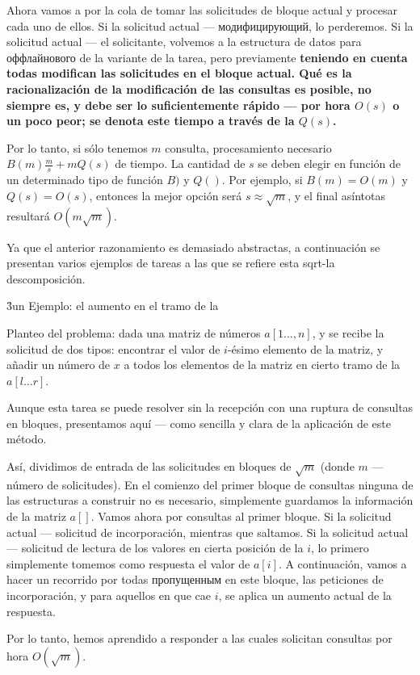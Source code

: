 Ahora vamos a por la cola de tomar las solicitudes de bloque actual y procesar cada uno de ellos. Si la solicitud actual --- модифицирующий, lo perderemos. Si la solicitud actual --- el solicitante, volvemos a la estructura de datos para оффлайнового de la variante de la tarea, pero previamente \bf{teniendo en cuenta todas modifican las solicitudes en el bloque actual}. Qué es la racionalización de la modificación de las consultas es posible, no siempre es, y debe ser lo suficientemente rápido --- por hora $O(s)$ o un poco peor; se denota este tiempo a través de la $Q(s)$.

Por lo tanto, si sólo tenemos $m$ consulta, procesamiento necesario $B(m) \frac{m}{s} + m Q(s)$ de tiempo. La cantidad de $s$ se deben elegir en función de un determinado tipo de función $B)$ y $Q()$. Por ejemplo, si $B(m)=O(m)$ y $Q(s)=O(s)$, entonces la mejor opción será $s \approx \sqrt{m}$, y el final asíntotas resultará $O (m \sqrt{m})$.

Ya que el anterior razonamiento es demasiado abstractas, a continuación se presentan varios ejemplos de tareas a las que se refiere esta sqrt-la descomposición.


\h3{un Ejemplo: el aumento en el tramo de la}

Planteo del problema: dada una matriz de números $a[1 \ldots, n]$, y se recibe la solicitud de dos tipos: encontrar el valor de $i$-ésimo elemento de la matriz, y añadir un número de $x$ a todos los elementos de la matriz en cierto tramo de la $a[l \dots r]$.

Aunque esta tarea se puede resolver sin la recepción con una ruptura de consultas en bloques, presentamos aquí --- como sencilla y clara de la aplicación de este método.

Así, dividimos de entrada de las solicitudes en bloques de $\sqrt{m}$ (donde $m$ --- número de solicitudes). En el comienzo del primer bloque de consultas ninguna de las estructuras a construir no es necesario, simplemente guardamos la información de la matriz $a[]$. Vamos ahora por consultas al primer bloque. Si la solicitud actual --- solicitud de incorporación, mientras que saltamos. Si la solicitud actual --- solicitud de lectura de los valores en cierta posición de la $i$, lo primero simplemente tomemos como respuesta el valor de $a[i]$. A continuación, vamos a hacer un recorrido por todas пропущенным en este bloque, las peticiones de incorporación, y para aquellos en que cae $i$, se aplica un aumento actual de la respuesta.

Por lo tanto, hemos aprendido a responder a las cuales solicitan consultas por hora $O(\sqrt{m})$.

